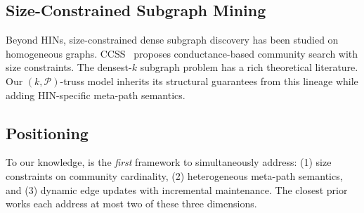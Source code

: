 \subsection{Size-Constrained Subgraph Mining}

Beyond HINs, size-constrained dense subgraph discovery has been studied on homogeneous graphs. CCSS~\cite{he2024eswa} proposes conductance-based community search with size constraints. The densest-$k$ subgraph problem has a rich theoretical literature. Our $(k,\mathcal{P})$-truss model inherits its structural guarantees from this lineage while adding HIN-specific meta-path semantics.

\subsection{Positioning}

To our knowledge, \DynaSCSH is the \emph{first} framework to simultaneously address: (1) size constraints on community cardinality, (2) heterogeneous meta-path semantics, and (3) dynamic edge updates with incremental maintenance. The closest prior works each address at most two of these three dimensions.
